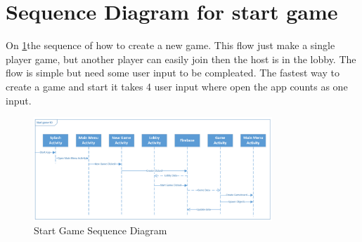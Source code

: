 \section{Sequence Diagram for start game}

On \ref{SequenceDiagram}the sequence of how to create a new game. This flow just make a single player game, but another player can easily join then the host is in the lobby. The flow is simple but need some user input to be compleated. The fastest way to create a game and start it takes 4 user input where open the app counts as one input. 

\begin{figure}
	\centering
	\includegraphics[width=0.8\textwidth]{images/Start_Game_Sequence_Diagram.png}
	\caption{Start Game Sequence Diagram \label{SequenceDiagram}}
\end{figure}
